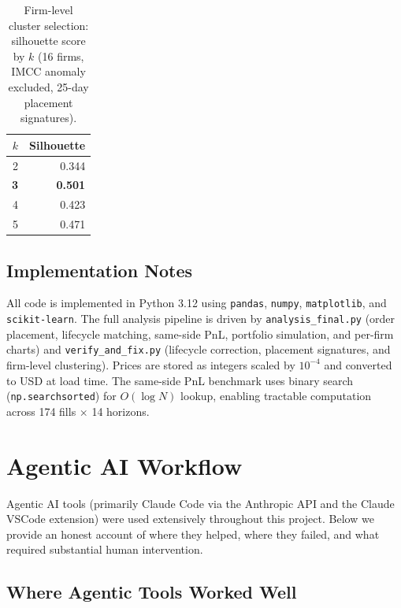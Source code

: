\documentclass[11pt, letterpaper]{article}
\begin{document}
\begin{table}[H]
\centering
\caption{Firm-level cluster selection: silhouette score by $k$
(16 firms, IMCC anomaly excluded, 25-day placement signatures).}
\label{tab:elbow}
\begin{tabular}{@{} r r @{}}
\toprule
$k$ & Silhouette \\
\midrule
2 & 0.344 \\
\textbf{3} & \textbf{0.501} \\
4 & 0.423 \\
5 & 0.471 \\
\bottomrule
\end{tabular}
\end{table}

\subsection{Implementation Notes}

All code is implemented in Python 3.12 using \texttt{pandas}, \texttt{numpy},
\texttt{matplotlib}, and \texttt{scikit-learn}.
The full analysis pipeline is driven by \texttt{analysis\_final.py} (order
placement, lifecycle matching, same-side PnL, portfolio simulation, and
per-firm charts) and \texttt{verify\_and\_fix.py} (lifecycle correction,
placement signatures, and firm-level clustering).
Prices are stored as integers scaled by $10^{-4}$ and converted to USD at
load time.
The same-side PnL benchmark uses binary search (\texttt{np.searchsorted}) for
$O(\log N)$ lookup, enabling tractable computation across 174 fills $\times$
14 horizons.

\section{Agentic AI Workflow}

Agentic AI tools (primarily Claude Code via the Anthropic API and the Claude
VSCode extension) were used extensively throughout this project.
Below we provide an honest account of where they helped, where they failed,
and what required substantial human intervention.

\subsection{Where Agentic Tools Worked Well}
\end{document}
